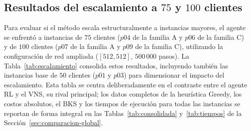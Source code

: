 
\subsection{Resultados del escalamiento a $75$ y $100$ clientes} \label{sec:resultadosescalamiento}
Para evaluar si el método escala estructuralmente a instancias mayores, el agente se enfrentó a instancias de $75$ clientes ($p04$ de la familia A y $p06$ de la familia C) y de $100$ clientes ($p07$ de la familia A y $p09$ de la familia C), utilizando la configuración de red ampliada ($[512,512]$, $500\,000$ pasos). La Tabla~\ref{tab:escalamiento} consolida estos resultados, incluyendo también las instancias base de $50$ clientes ($p01$ y $p03$) para dimensionar el impacto del escalamiento. Esta tabla se centra deliberadamente en el contraste entre el agente RL y el VNS, su rival principal; los datos completos de la heurística Greedy, los costos absolutos, el BKS y los tiempos de ejecución para todas las instancias se reportan de forma integral en las Tablas~\ref{tab:consolidada} y~\ref{tab:tiempos} de la Sección~\ref{sec:comparacion-global}.  

